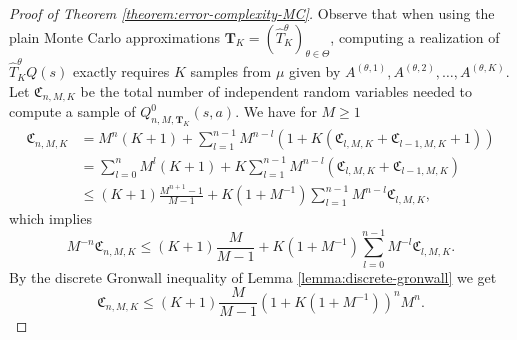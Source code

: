 \documentclass[11pt]{article}
\numberwithin{equation}{section}
\theoremstyle{definition}
\theoremstyle{remark}
\begin{document}
\begin{proof}[Proof of Theorem \ref{theorem:error-complexity-MC}]
Observe that 
when using the plain Monte Carlo approximations $ \mathbf{T}_K = (\hat T^\theta_K)_{\theta \in \Theta}$, computing a realization of $\hat T^\theta_{K}Q(s)$ exactly requires  $K$ samples from  $\mu$ given by $A^{(\theta, 1)}, \allowbreak A^{(\theta, 2)}, \ldots, A^{(\theta,K)}$.
Let $\mathfrak C_{n,M, K}$ be the total number of independent random variables needed to compute a sample of $Q ^{0}_{n,M, \mathbf{T}_K}(s,a)$. We have for $M \geq 1$
\begin{equation}
    \label{eq:complexity-analysis}
    \begin{aligned}
        \mathfrak C_{n,M, K} & = M ^{n}(K + 1) + \sum_{l = 1}^{n-1} M ^{n - l}\left( 1
        + K(\mathfrak C _{l,M,K} + \mathfrak C _{l-1,M,K} + 1)\right)                                                                      \\
                            & = \sum_{l = 0}^n M^l (K + 1) + K\sum_{l = 1}^{n-1} M ^{n - l} (\mathfrak C _{l,M,K} + \mathfrak C_{l-1,M,K}) \\
                            & \leq (K+1) \frac{M^{n+1} - 1}{M - 1} + K(1 + M^{-1}) \sum_{l = 1}^{n-1} M^{n-l} \mathfrak C_{l,M,K},
    \end{aligned}
\end{equation}
which implies
\begin{equation*}
    \label{eq:complexity-upper-bound}
    M^{-n} \mathfrak C_{n,M, K} \leq (K + 1) \frac{M}{M-1} + K (1 + M^{-1}) \sum_{l = 0}^{n-1}M^{-l} \mathfrak C_{l,M,K}.
\end{equation*}
By the discrete Gronwall inequality of Lemma \ref{lemma:discrete-gronwall} we get
\begin{equation}
    \label{eq:gronwall-cost}
    \mathfrak C_{n,M,K} \leq (K + 1) \frac{M}{M-1} (1 + K (1 + M^{-1}))^n M^n.
\end{equation}


\end{proof}
\end{document}
